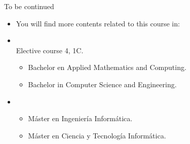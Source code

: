 \begin{frame}[t]{To be continued}
\begin{itemize}
  \item You will find more contents related to this course in:

  \item {}\\
        Elective course 4, 1C.
    \begin{itemize}
      \item Bachelor en Applied Mathematics and Computing.
      \item Bachelor in Computer Science and Engineering.
    \end{itemize}

  \item {}
    \begin{itemize}
      \item Máster en Ingeniería Informática.
      \item Máster en Ciencia y Tecnología Informática.
    \end{itemize}
\end{itemize}
\end{frame}

